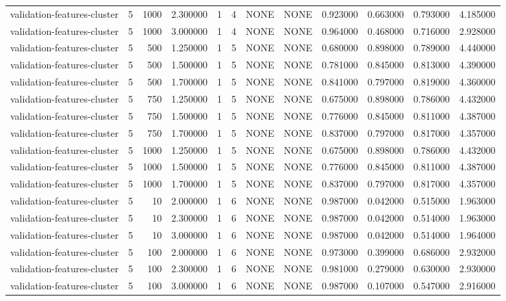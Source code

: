 \begin{tabular}{lrrrllllrrrr}
validation-features-cluster & 5 & 1000 & 2.300000 & 1 & 4 & NONE & NONE & 0.923000 & 0.663000 & 0.793000 & 4.185000 \\
validation-features-cluster & 5 & 1000 & 3.000000 & 1 & 4 & NONE & NONE & 0.964000 & 0.468000 & 0.716000 & 2.928000 \\
validation-features-cluster & 5 & 500 & 1.250000 & 1 & 5 & NONE & NONE & 0.680000 & 0.898000 & 0.789000 & 4.440000 \\
validation-features-cluster & 5 & 500 & 1.500000 & 1 & 5 & NONE & NONE & 0.781000 & 0.845000 & 0.813000 & 4.390000 \\
validation-features-cluster & 5 & 500 & 1.700000 & 1 & 5 & NONE & NONE & 0.841000 & 0.797000 & 0.819000 & 4.360000 \\
validation-features-cluster & 5 & 750 & 1.250000 & 1 & 5 & NONE & NONE & 0.675000 & 0.898000 & 0.786000 & 4.432000 \\
validation-features-cluster & 5 & 750 & 1.500000 & 1 & 5 & NONE & NONE & 0.776000 & 0.845000 & 0.811000 & 4.387000 \\
validation-features-cluster & 5 & 750 & 1.700000 & 1 & 5 & NONE & NONE & 0.837000 & 0.797000 & 0.817000 & 4.357000 \\
validation-features-cluster & 5 & 1000 & 1.250000 & 1 & 5 & NONE & NONE & 0.675000 & 0.898000 & 0.786000 & 4.432000 \\
validation-features-cluster & 5 & 1000 & 1.500000 & 1 & 5 & NONE & NONE & 0.776000 & 0.845000 & 0.811000 & 4.387000 \\
validation-features-cluster & 5 & 1000 & 1.700000 & 1 & 5 & NONE & NONE & 0.837000 & 0.797000 & 0.817000 & 4.357000 \\
validation-features-cluster & 5 & 10 & 2.000000 & 1 & 6 & NONE & NONE & 0.987000 & 0.042000 & 0.515000 & 1.963000 \\
validation-features-cluster & 5 & 10 & 2.300000 & 1 & 6 & NONE & NONE & 0.987000 & 0.042000 & 0.514000 & 1.963000 \\
validation-features-cluster & 5 & 10 & 3.000000 & 1 & 6 & NONE & NONE & 0.987000 & 0.042000 & 0.514000 & 1.964000 \\
validation-features-cluster & 5 & 100 & 2.000000 & 1 & 6 & NONE & NONE & 0.973000 & 0.399000 & 0.686000 & 2.932000 \\
validation-features-cluster & 5 & 100 & 2.300000 & 1 & 6 & NONE & NONE & 0.981000 & 0.279000 & 0.630000 & 2.930000 \\
validation-features-cluster & 5 & 100 & 3.000000 & 1 & 6 & NONE & NONE & 0.987000 & 0.107000 & 0.547000 & 2.916000 \\

\end{tabular}
